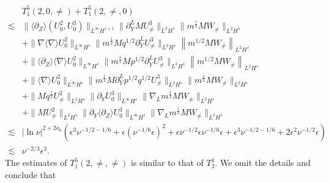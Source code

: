 \documentclass[12pt]{article}
\newcommand{\wtb}{\langle\partial_Z\rangle }
\newcommand{\nm}[2]{\left\| #1 \right\| _{#2} }
\numberwithin{equation}{section}
\begin{document}
	\begin{equation}\label{ineq-t41}
	    \begin{aligned}
		~&T^5_1(2,0,\neq)+T^5_1(2,\neq,0)\\
		\lesssim&\|\wtb (U^2_0,U^3_0)\|_{L^{\infty} H^{s+1}}\|\partial_Y^LMU^3_{\neq}\|_{L^2H^s}\|m^{\frac{1}{2}}MW_{\neq}\|_{L^2H^s}\\
        ~&+\|\nabla\langle \nabla\rangle U^2_{0}\|_{L^\infty H^s}\|m^{\frac{1}{2}}M q^{1/2} \partial_Y^L U^3_{\neq}\|_{L^2H^s} \nm{m^{1/2}MW_{\neq}}{L^2 H^s} \\
        ~&+\|\wtb \langle \nabla\rangle U^2_{0}\|_{L^\infty H^s}\|m^{\frac{1}{2}}M p^{1/2} \partial_Y^L U^3_{\neq}\|_{L^2H^s} \nm{m^{1/2}MW_{\neq}}{L^2 H^s} \\
		~&+\|\langle\nabla\rangle U^2_{0}\|_{L^\infty H^s}\|m^{\frac{1}{2}} M \partial_Y^L p^{1/2} q^{1/2}   U^3_{\neq}\|_{L^2H^s}\|m^{\frac{1}{2}}M W_{\neq}\|_{L^2H^s}\\
		~&+\|Mq^{\frac{1}{2}}U^2_{\neq}\|_{L^2H^s}\|\partial_Y U^3_0\|_{L^\infty H^{s}}\|\nabla_Lm^{\frac{1}{2}}MW_{\neq}\|_{L^2H^s}\\
		~&+\|MU^2_{\neq}\|_{L^2H^s}\|\partial_Y \wtb U^3_0\|_{L^\infty H^{s}}\|\nabla_Lm^{\frac{1}{2}}MW_{\neq}\|_{L^2H^s}\\
		\lesssim& |\ln{\nu}|^{2+2a_0} ( \epsilon^3 \nu^{-1/2-1/6}+\epsilon(\nu^{-1/6}\epsilon)^2+\epsilon\nu^{-1/2}\epsilon\nu^{-1/6}\epsilon+ \epsilon^3 \nu^{-1/2-1/6} +2\epsilon^2\nu^{-1/2}\epsilon)\\
        \lesssim&\nu^{-2/3}\epsilon^3.
	\end{aligned}
	\end{equation}
	The estimates of $T^5_1(2,\neq,\neq)$ is similar to that of $T^1_3$. We omit the details and conclude that
\end{document}
